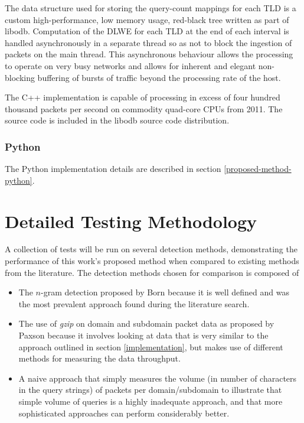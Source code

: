 \documentclass[12pt]{report}
\theoremstyle{remark}
\theoremstyle{definition}
\theoremstyle{definition}
\theoremstyle{definition}
\begin{document}
The data structure used for storing the query-count mappings for each TLD is a
custom high-performance, low memory usage, red-black tree written as part of
libodb\cite{Friesen2013}. Computation of the DLWE for each TLD at the end of
each interval is handled asynchronously in a separate thread so as not to block
the ingestion of packets on the main thread. This asynchronous behaviour allows
the processing to operate on very busy networks and allows for inherent and
elegant non-blocking buffering of bursts of traffic beyond the processing rate
of the host.

The C++ implementation is capable of processing in excess of four hundred
thousand packets per second on commodity quad-core CPUs from 2011. The source
code is included in the libodb source code distribution\cite{Friesen2013}.

\subsection{Python} The Python implementation details are described in section
\ref{proposed-method-python}.

\chapter{Detailed Testing Methodology} A collection of tests will be run on
several detection methods, demonstrating the performance of this work's proposed
method when compared to existing methods from the literature. The detection
methods chosen for comparison is composed of

\begin{itemize}
\item The $n$-gram detection proposed by Born\cite{Born2010.cfa} because it is
well defined and was the most prevalent approach found during the literature
search.
\item The use of \emph{gzip} on domain and subdomain packet data as proposed by
Paxson\cite{Paxson2011} because it involves looking at data that is very similar
to the approach outlined in section \ref{implementation}, but makes use of
different methods for measuring the data throughput.
\item A naive approach that simply measures the volume (in number of characters
in the query strings) of packets per domain/subdomain to illustrate that simple
volume of queries is a highly inadequate approach, and that more sophisticated
approaches can perform considerably better.
\end{itemize}
\end{document}
